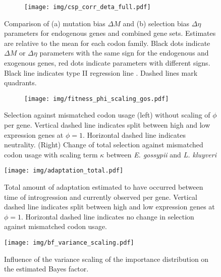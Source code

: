 \documentclass[doublespacing,linenumbers]{bmcart}
\newcommand{\kluyveri}{\textit{L. kluyveri}\xspace}
\newcommand{\gossypii}{\textit{E. gossypii}\xspace}
\newcommand{\DM}{\ensuremath{{\Delta M}}\xspace}
\newcommand{\DE}{\ensuremath{{\Delta \eta}}\xspace}
\begin{document}
\begin{backmatter}
\begin{figure}
    \centering
    \begin{subfigure}
        \centering
    \end{subfigure}
    \begin{subfigure}
        \centering
        \texttt{[image: img/csp\_corr\_deta\_full.pdf]}
    \end{subfigure}
    \caption{Comparison of (a) mutation bias \DM and (b) selection bias \DE parameters for endogenous genes and combined gene sets.
      Estimates are relative to the mean for each codon family.
      Black dots indicate \DM or \DE parameters with the same sign for the endogenous and exogenous genes, red dots indicate parameters with different signs.
      Black line indicates type II regression line \citep{SokalAndRohlf1981}.
      Dashed lines mark quadrants.}
    \label{fig:csp_end_comb}
\end{figure}
\null
\vfill
\clearpage

\begin{figure}
    \centering
    \begin{subfigure}
        \centering
    \end{subfigure}
    \begin{subfigure}
        \centering
        \texttt{[image: img/fitness\_phi\_scaling\_gos.pdf]}
    \end{subfigure}
    \caption{Selection against mismatched codon usage (left) without scaling of $\phi$ per gene. 
    Vertical dashed line indicates split between high and low expression genes at $\phi = 1$.
    Horizontal dashed line indicates neutrality.
     (Right) Change of total selection against mismatched codon usage with scaling term $\kappa$ between \gossypii and \kluyveri}
    \label{fig:sne_scaling}
\end{figure}
\null
\vfill
\clearpage
\null
\vfill
\begin{figure}
     \centering
	\texttt{[image: img/adaptation\_total.pdf]}
	\caption{Total amount of adaptation estimated to have occurred between time of introgression and currently observed per gene.
	    Vertical dashed line indicates split between high and low expression genes at $\phi = 1$.
	    Horizontal dashed line indicates no change in selection against mismatched codon usage.}
	\label{fig:adapt_tot}
\end{figure}
\null
\vfill
\clearpage
\null
\vfill
\begin{figure}
     \centering
	\texttt{[image: img/bf\_variance\_scaling.pdf]}
	\caption{Influence of the variance scaling of the importance distribution on the estimated Bayes factor.}
	\label{fig:bf_scaling}
\end{figure}
\null
\vfill
\clearpage


\end{backmatter}
\end{document}
